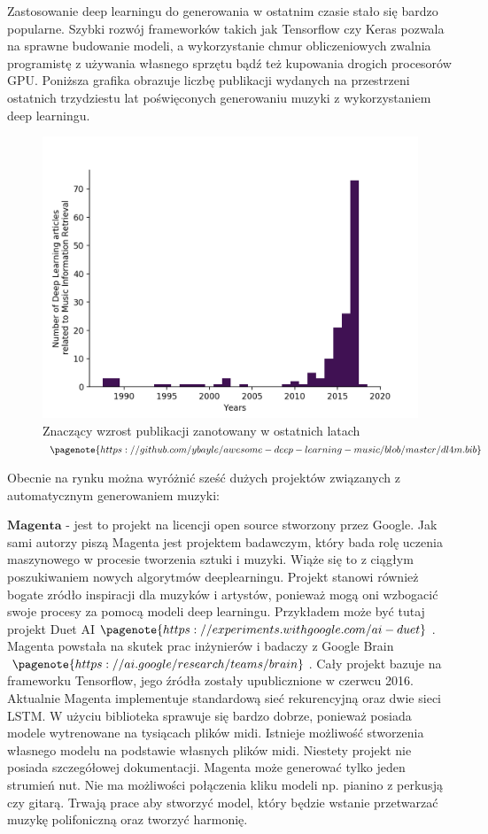 











	
	Zastosowanie deep learningu do generowania w ostatnim czasie stało się bardzo popularne. Szybki rozwój frameworków takich jak Tensorflow czy Keras pozwala na sprawne budowanie modeli, a wykorzystanie chmur obliczeniowych zwalnia programistę z używania własnego sprzętu bądź też kupowania drogich procesorów GPU. Poniższa grafika obrazuje liczbę publikacji wydanych na przestrzeni ostatnich trzydziestu lat poświęconych generowaniu muzyki z wykorzystaniem deep learningu.
	
	\begin{figure}[H]
		\centering
		\includegraphics[width=0.7\linewidth]{xxxxxxxxxx}
		\caption{Znaczący wzrost publikacji zanotowany w ostatnich latach $\pagenote{https://github.com/ybayle/awesome-deep-learning-music/blob/master/dl4m.bib}$}
		\label{fig:xxxxxxxxxx}
	\end{figure}
	
	Obecnie na rynku można wyróżnić sześć dużych projektów związanych z automatycznym generowaniem muzyki:
	
 $\textbf{Magenta}$ - jest to projekt na licencji open source stworzony przez Google. Jak sami autorzy piszą Magenta jest projektem badawczym, który bada rolę uczenia maszynowego w procesie tworzenia sztuki i muzyki. Wiąże się to z ciągłym poszukiwaniem nowych algorytmów deeplearningu. Projekt stanowi również bogate zródło inspiracji dla muzyków i artystów, ponieważ mogą oni wzbogacić swoje procesy za pomocą modeli deep learningu. Przykładem może być tutaj projekt Duet AI$\pagenote{https://experiments.withgoogle.com/ai-duet}$. Magenta powstała na skutek prac inżynierów i badaczy z Google Brain$\pagenote{https://ai.google/research/teams/brain}$. Cały projekt bazuje na frameworku Tensorflow, jego źródła zostały upublicznione w czerwcu 2016. Aktualnie Magenta implementuje standardową sieć rekurencyjną oraz dwie sieci LSTM. W użyciu biblioteka sprawuje się bardzo dobrze, ponieważ posiada modele wytrenowane na tysiącach plików midi. Istnieje możliwość stworzenia własnego modelu na podstawie własnych plików midi. Niestety projekt nie posiada szczegółowej dokumentacji. Magenta może generować tylko jeden strumień nut. Nie ma możliwości połączenia kliku modeli np. pianino z perkusją czy gitarą. Trwają prace aby stworzyć model, który będzie wstanie przetwarzać muzykę polifoniczną oraz tworzyć harmonię. 
  
